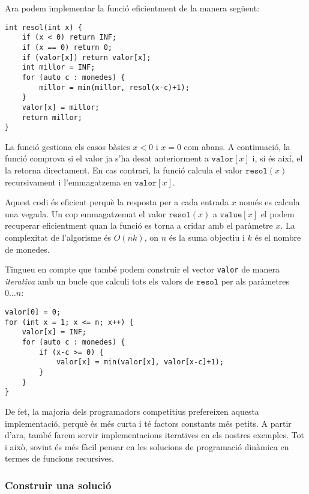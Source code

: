 Ara podem implementar la funció eficientment
de la manera següent:
\begin{lstlisting}
int resol(int x) {
    if (x < 0) return INF;
    if (x == 0) return 0;
    if (valor[x]) return valor[x];
    int millor = INF;
    for (auto c : monedes) {
        millor = min(millor, resol(x-c)+1);
    }
    valor[x] = millor;
    return millor;
}
\end{lstlisting}

La funció gestiona els casos bàsics
$x<0$ i $x=0$ com abans.
A continuació, la funció comprova si
el valor ja s'ha desat anteriorment a $\texttt{valor}[x]$
i, si és així, el la retorna directament.
En cas contrari, la funció calcula el valor
$\texttt{resol}(x)$ recursivament i
l'emmagatzema en $\texttt{valor}[x]$.

Aquest codi és eficient perquè la resposta
per a cada entrada $x$
només es calcula una vegada.
Un cop emmagatzemat el valor $\texttt{resol}(x)$ a $\texttt{value}[x]$
el podem recuperar eficientment quan la
funció es torna a cridar amb el paràmetre $x$.
La complexitat de l'algorisme és $O(nk)$,
on $n$ és la suma objectiu i $k$ és el nombre de monedes.

Tingueu en compte que també podem construir el
vector \texttt{valor} de manera \emph{iterativa} amb un
bucle que calculi tots els valors
de $\texttt{resol}$ per als paràmetres $0 \ldots n$:
\begin{lstlisting}
valor[0] = 0;
for (int x = 1; x <= n; x++) {
    valor[x] = INF;
    for (auto c : monedes) {
        if (x-c >= 0) {
            valor[x] = min(valor[x], valor[x-c]+1);
        }
    }
}
\end{lstlisting}

De fet, la majoria dels programadors competitius prefereixen
aquesta implementació, perquè és més curta i té
factors constants més petits.
A partir d'ara, també farem servir implementacions iteratives
en els nostres exemples.
Tot i això, sovint és més fàcil pensar
en les solucions de programació dinàmica
en termes de funcions recursives.


\subsubsection{Construir una solució}

